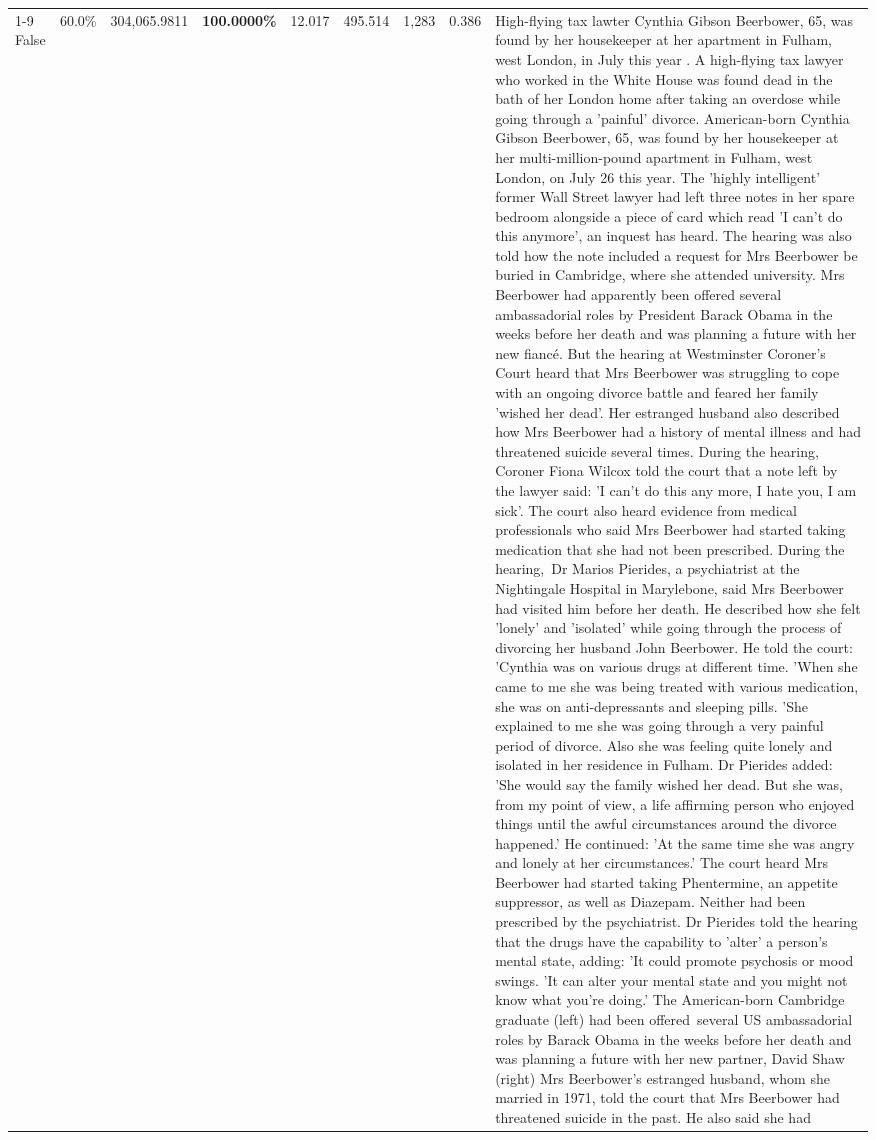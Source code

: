 \begin{table}[H]
\begin{tabular}{lllrlllll}
\cline{1-9}
False & 60.0\% & \color{red} 304,065.9811 & \bfseries \color{red} 100.0000\% & 12.017 & 495.514 & 1,283 & 0.386 & High-flying tax lawter Cynthia Gibson Beerbower, 65, was found by her housekeeper at her apartment in Fulham, west London, in July this year . A high-flying tax lawyer who worked in the White House was found dead in the bath of her London home after taking an overdose while going through a 'painful' divorce. American-born Cynthia Gibson Beerbower, 65, was found by her housekeeper at her multi-million-pound apartment in Fulham, west London, on July 26 this year. The 'highly intelligent' former Wall Street lawyer had left three notes in her spare bedroom alongside a piece of card which read 'I can't do this anymore', an inquest has heard. The hearing was also told how the note included a request for Mrs Beerbower be buried in Cambridge, where she attended university. Mrs Beerbower had apparently been offered several ambassadorial roles by President Barack Obama in the weeks before her death and was planning a future with her new fiancé. But the hearing at Westminster Coroner's Court heard that Mrs Beerbower was struggling to cope with an ongoing divorce battle and feared her family 'wished her dead'. Her estranged husband also described how Mrs Beerbower had a history of mental illness and had threatened suicide several times. During the hearing, Coroner Fiona Wilcox told the court that a note left by the lawyer said: 'I can't do this any more, I hate you, I am sick'. The court also heard evidence from medical professionals who said Mrs Beerbower had started taking medication that she had not been prescribed. During the hearing, Dr Marios Pierides, a psychiatrist at the Nightingale Hospital in Marylebone, said Mrs Beerbower had visited him before her death. He described how she felt 'lonely' and 'isolated' while going through the process of divorcing her husband John Beerbower. He told the court: 'Cynthia was on various drugs at different time. 'When she came to me she was being treated with various medication, she was on anti-depressants and sleeping pills. 'She explained to me she was going through a very painful period of divorce. Also she was feeling quite lonely and isolated in her residence in Fulham. Dr Pierides added: 'She would say the family wished her dead. But she was, from my point of view, a life affirming person who enjoyed things until the awful circumstances around the divorce happened.' He continued: 'At the same time she was angry and lonely at her circumstances.' The court heard Mrs Beerbower had started taking Phentermine, an appetite suppressor, as well as Diazepam. Neither had been prescribed by the psychiatrist. Dr Pierides told the hearing that the drugs have the capability to 'alter' a person's mental state, adding: 'It could promote psychosis or mood swings. 'It can alter your mental state and you might not know what you're doing.' The American-born Cambridge graduate (left) had been offered several US ambassadorial roles by Barack Obama in the weeks before her death and was planning a future with her new partner, David Shaw (right) Mrs Beerbower's estranged husband, whom she married in 1971, told the court that Mrs Beerbower had threatened suicide in the past. He also said she had 
\end{tabular}
\end{table}
